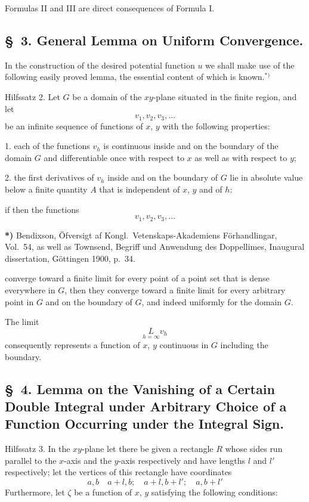 \documentclass{article}
\begin{document}
Formulas II and III are direct consequences of Formula I.

\subsection*{§~3. General Lemma on Uniform Convergence.}

In the construction of the desired potential function $u$ we shall make use of the following easily proved lemma, the essential content of which is known.${}^{*)}$

Hilfssatz 2. Let $G$ be a domain of the $xy$-plane situated in the finite region, and let
\[
v_1, v_2, v_3, \dots
\]
be an infinite sequence of functions of $x$, $y$ with the following properties:

1. each of the functions $v_h$ is continuous inside and on the boundary of the domain $G$ and differentiable once with respect to $x$ as well as with respect to $y$;

2. the first derivatives of $v_h$ inside and on the boundary of $G$ lie in absolute value below a finite quantity $A$ that is independent of $x$, $y$ and of $h$:

if then the functions
\[
v_1, v_2, v_3, \dots
\]

\textbf{*)} Bendixson, Öfversigt af Kongl.\ Vetenskaps-Akademiens Förhandlingar, Vol.~54, as well as Townsend, Begriff und Anwendung des Doppellimes, Inaugural dissertation, Göttingen 1900, p.~34.

converge toward a finite limit for every point of a point set that is dense everywhere in $G$, then they converge toward a finite limit for every arbitrary point in $G$ and on the boundary of $G$, and indeed uniformly for the domain $G$.

The limit
\[
\underset{h=\infty}{L} v_h
\]
consequently represents a function of $x$, $y$ continuous in $G$ including the boundary.

\subsection*{§~4. Lemma on the Vanishing of a Certain Double Integral under Arbitrary Choice of a Function Occurring under the Integral Sign.}

Hilfssatz 3. In the $xy$-plane let there be given a rectangle $R$ whose sides run parallel to the $x$-axis and the $y$-axis respectively and have lengths $l$ and $l'$ respectively; let the vertices of this rectangle have coordinates
\[
a, b \quad a+l, b; \quad a+l, b+l'; \quad a, b+l'
\]
Furthermore, let $\zeta$ be a function of $x$, $y$ satisfying the following conditions:
\end{document}

